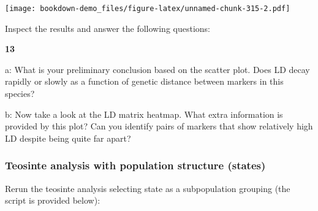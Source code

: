 \documentclass[
]{book}
\makeatletter
\newenvironment{kframe}{%
\medskip{}
\setlength{\fboxsep}{.8em}
 \def\at@end@of@kframe{}%
 \ifinner\ifhmode%
  \def\at@end@of@kframe{\end{minipage}}%
  \begin{minipage}{\columnwidth}%
 \fi\fi%
 \def\FrameCommand##1{\hskip\@totalleftmargin \hskip-\fboxsep
 \colorbox{shadecolor}{##1}\hskip-\fboxsep
     \hskip-\linewidth \hskip-\@totalleftmargin \hskip\columnwidth}%
 \MakeFramed {\advance\hsize-\width
   \@totalleftmargin\z@ \linewidth\hsize
   \@setminipage}}%
 {\par\unskip\endMakeFramed%
 \at@end@of@kframe}
\newenvironment{rmdblock}[1]
  {
  \begin{itemize}
  \renewcommand{\labelitemi}{
    \raisebox{-.7\height}[0pt][0pt]{
      {\setkeys{Gin}{width=3em,keepaspectratio}\texttt{[image: images/\#1]}}
    }
  }
  \setlength{\fboxsep}{1em}
  \begin{kframe}
  \item
  }
  {
  \end{kframe}
  \end{itemize}
  }
\newenvironment{rmdquiz}
  {\begin{rmdblock}{quiz}}
  {\end{rmdblock}}
\makeatother
\begin{document}
\texttt{[image: bookdown-demo\_files/figure-latex/unnamed-chunk-315-2.pdf]}

Inspect the results and answer the following questions:

\begin{rmdquiz}
\textbf{13}

a: What is your preliminary conclusion based on the scatter plot. Does LD decay rapidly or slowly as a function of genetic distance between markers in this species?

b: Now take a look at the LD matrix heatmap. What extra information is provided by this plot? Can you identify pairs of markers that show relatively high LD despite being quite far apart?
\end{rmdquiz}

\hypertarget{teosinte-analysis-with-population-structure-states}{%
\subsubsection{Teosinte analysis with population structure (states)}\label{teosinte-analysis-with-population-structure-states}}

Rerun the teosinte analysis selecting state as a subpopulation grouping (the script is provided below):
\end{document}
